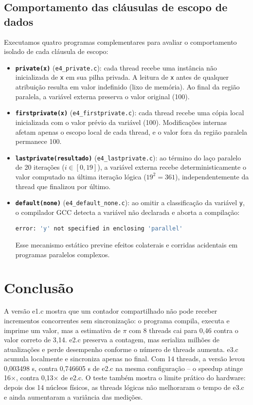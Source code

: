 \documentclass[11pt,letterpaper]{article}
\begin{document}
\subsection{Comportamento das cláusulas de escopo de dados}
Executamos quatro programas complementares para avaliar o comportamento isolado de cada cláusula de escopo:

\begin{itemize}
    \item \textbf{\texttt{private(x)}} (\texttt{e4\_private.c}): cada thread recebe uma instância não inicializada de \texttt{x} em sua pilha privada. A leitura de \texttt{x} antes de qualquer atribuição resulta em valor indefinido (lixo de memória). Ao final da região paralela, a variável externa preserva o valor original (100).
    
    \item \textbf{\texttt{firstprivate(x)}} (\texttt{e4\_firstprivate.c}): cada thread recebe uma cópia local inicializada com o valor prévio da variável (100). Modificações internas afetam apenas o escopo local de cada thread, e o valor fora da região paralela permanece 100.
    
    \item \textbf{\texttt{lastprivate(resultado)}} (\texttt{e4\_lastprivate.c}): ao término do laço paralelo de 20 iterações ($i \in [0, 19]$), a variável externa recebe deterministicamente o valor computado na última iteração lógica ($19^2 = 361$), independentemente da thread que finalizou por último.
    
    \item \textbf{\texttt{default(none)}} (\texttt{e4\_default\_none.c}): ao omitir a classificação da variável \texttt{y}, o compilador GCC detecta a variável não declarada e aborta a compilação:
    \begin{lstlisting}[language=bash]
error: 'y' not specified in enclosing 'parallel'
    \end{lstlisting}
    Esse mecanismo estático previne efeitos colaterais e corridas acidentais em programas paralelos complexos.
\end{itemize}

\section{Conclusão}
A versão e1.c mostra que um contador compartilhado não pode receber incrementos concorrentes sem sincronização: o programa compila, executa e imprime um valor, mas a estimativa de $\pi$ com 8 threads cai para 0,46 contra o valor correto de 3,14. e2.c preserva a contagem, mas serializa milhões de atualizações e perde desempenho conforme o número de threads aumenta. e3.c acumula localmente e sincroniza apenas no final. Com 14 threads, a versão levou 0,003498 s, contra 0,746605 s de e2.c na mesma configuração -- o speedup atinge 16$\times$, contra 0,13$\times$ de e2.c. O teste também mostra o limite prático do hardware: depois dos 14 núcleos físicos, as threads lógicas não melhoraram o tempo de e3.c e ainda aumentaram a variância das medições.
\end{document}
